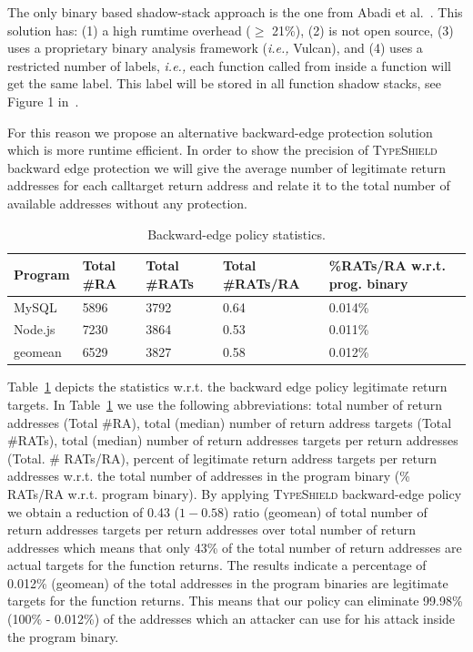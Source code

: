 The only binary
based shadow-stack approach is the one from Abadi et al.~\cite{abadi:cfi2}. This solution has:
(1) a high rumtime overhead ($\ge$ 21\%), 
(2) is not open source, 
(3) uses a proprietary binary analysis framework (\textit{i.e.,} Vulcan), and
(4) uses a restricted number of labels, \textit{i.e.,} each function called from inside a function will get the same label. This label will be 
stored in all function shadow stacks, see Figure 1 in~\cite{abadi:cfi2}. 

For this reason we propose an alternative backward-edge protection solution which is more runtime efficient.
In order to show the precision of \textsc{TypeShield} backward edge protection we will give the average number of legitimate return addresses for each calltarget return address 
and relate it to the total number of available addresses without any protection.

\begin{table}[H]
\centering 
 \begin{tabular}{ l | p{.5cm}  | p{.5cm}  | p{1.5cm}  | p{1.8cm} } 
  \textbf{Program}  & Total \#RA    & Total \#RATs  & Total \#RATs/RA  & \%RATs/RA w.r.t. prog. binary \\\hline 
  MySQL             & 5896          & 3792          & 0.64             & 0.014\%                       \\
  Node.js           & 7230          & 3864          & 0.53             & 0.011\%                       \\
  geomean           & 6529          & 3827          & 0.58             & 0.012\%                       \\\hline
\end{tabular}
\caption{Backward-edge policy statistics.}
\label{Backward-edge policy statistics.}
\vspace{-.5cm}
\end{table}

Table~\ref{Backward-edge policy statistics.} depicts the statistics w.r.t. the backward edge policy legitimate return targets.
In Table~\ref{Backward-edge policy statistics.} we use the following abbreviations:
total number of return addresses (Total \#RA),
total (median) number of return address targets (Total \#RATs),
total (median) number of return addresses targets per return addresses (Total. \# RATs/RA),
percent of legitimate return address targets per return addresses w.r.t. the total number of addresses in the program binary (\% RATs/RA w.r.t. program binary).
By applying \textsc{TypeShield} backward-edge policy we obtain a reduction of 0.43 ($1-0.58$) ratio (geomean)
of total number of return addresses targets per return addresses over total number of return addresses which means that only 43\% of the total number of return addresses are actual targets
for the function returns. The results indicate a percentage of 0.012\% (geomean) of the total addresses in the program binaries are legitimate targets for the function returns. This means
that our policy can eliminate 99.98\% (100\% - 0.012\%) of the addresses which an attacker can use for his attack inside the program binary.



